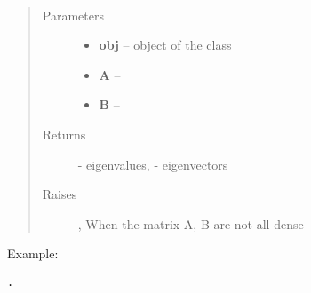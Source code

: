 \documentclass[letterpaper,10pt,english]{sphinxmanual}
\begin{document}
\begin{fulllineitems}
\label{index:brake.solve.solver.gev_dense}~\begin{quote}\begin{description}
\item[{Parameters}] \leavevmode\begin{itemize}
\item {} 
\textbf{obj} -- object of the class 

\item {} 
\textbf{A} -- 

\item {} 
\textbf{B} -- 

\end{itemize}

\item[{Returns}] \leavevmode
{} - eigenvalues,  - eigenvectors

\item[{Raises }] \leavevmode
{}, When the matrix A, B are not all dense

\end{description}\end{quote}

Example:

\begin{Verbatim}[commandchars=\\\{\}]
.
\end{Verbatim}

\end{fulllineitems}

\end{document}
